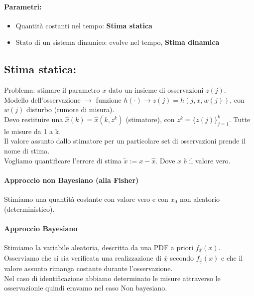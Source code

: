 \documentclass[11pt,a4paper]{article}
\begin{document}
\paragraph{Parametri:}
\begin{itemize}
  \item Quantità costanti nel tempo: \textbf{Stima statica}
  \item Stato di un sistema dinamico: evolve nel tempo, \textbf{Stima dinamica}
\end{itemize}

\subsection{Stima statica:}
Problema: stimare il parametro $x$ dato un insieme di osservazioni $z(j)$. \\
Modello dell'osservazione $\rightarrow$ funzione $h(\cdot) \rightarrow z(j)=h(j,x,w(j))$, con $w(j)$ disturbo (rumore di misura).\\

Devo restituire una $\hat x(k)=\hat x(k,z^k)$ (stimatore), con  $z^k=\{z(j)\}_{j=1}^{k}$. Tutte le misure da 1 a k. \\
Il valore assunto dallo stimatore per un particolare set di osservazioni prende il nome di stima. \\
Vogliamo quantificare l'errore di stima $\tilde x:=x-\hat x$. Dove $x$ è il valore vero.

\paragraph{Approccio non Bayesiano (alla Fisher)}
Stimiamo una quantità costante con valore vero e con $x_0$ non aleatorio (deterministico).

\paragraph{Approccio Bayesiano}
Stimiamo la variabile aleatoria, descritta da una PDF a priori $f_{\overline{\underline{x}}}(x)$. Osserviamo che si sia verificata una realizzazione di $\overline{\underline{x}}$ secondo $f_{\overline{\underline{x}}}(x)$ e che il valore assunto rimanga costante durante l'osservazione. \\
Nel caso di identificazione abbiamo determinato le misure attraverso le osservazionie quindi eravamo nel caso Non bayesiano. 
\end{document}
